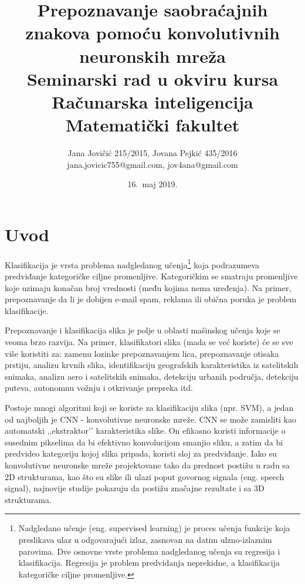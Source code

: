 \documentclass[a4paper]{article}
\begin{document}
\title{Prepoznavanje saobraćajnih znakova pomoću konvolutivnih neuronskih mreža\\ \small{Seminarski rad u okviru kursa\\Računarska inteligencija\\ Matematički fakultet}}

\author{Jana Jovičić 215/2015, Jovana Pejkić 435/2016 \\ jana.jovicic755@gmail.com, jov4ana@gmail.com}

\date{16.~maj 2019.}

\maketitle

\abstract{

}

\newpage

\tableofcontents

\newpage

\section{Uvod}
\label{sec:uvod}

Klasifikacija je vrsta problema nadgledanog učenja\footnote{Nadgledano učenje (eng. supervised learning) je proces učenja funkcije koja preslikava ulaz u odgovarajući izlaz, zasnovan na datim ulzno-izlaznim parovima. Dve osnovne vrste problema nadgledanog učenja su regresija i klasifikacija. Regresija je problem predvidanja neprekidne, a klasifikacija kategoričke ciljne promenljive.} koja podrazumeva predviđanje kategoričke ciljne promenljive. Kategoričkim se smatraju promenljive koje uzimaju konačan broj vrednosti (među kojima nema uređenja). Na primer, prepoznavanje da li je dobijen e-mail spam, reklama ili obična poruka je problem klasifikacije.

Prepoznavanje i klasifikacija slika je polje u oblasti mašinskog učenja koje se veoma brzo razvija. Na primer, klasifikatori slika (mada se već koriste) će se sve više koristiti za: zamenu lozinke prepoznavanjem lica, prepoznavanje otisaka prstiju, analizu krvnih slika, identifikaciju geografskih karakteristika iz satelitskih snimaka, analizu aero i satelitskih snimaka, detekciju urbanih područja, detekciju puteva, autonomnu vožnju i otkrivanje prepreka itd.

Postoje mnogi algoritmi koji se koriste za klasifikaciju slika (npr. SVM), a jedan od najboljih je CNN - konvolutivne neuronske mreže. CNN se može zamisliti kao automatski ‚‚ekstraktor’’ karakteristika slike. On efikasno koristi informacije o susednim pikselima da bi efektivno konvolucijom smanjio sliku, a zatim da bi predvideo kategoriju kojoj slika pripada, koristi sloj za predviđanje. Iako su konvolutivne neuronske mreže projektovane tako da prednost postižu u radu sa 2D strukturama, kao što su slike ili ulazi poput govornog signala (eng. speech signal), najnovije studije pokazuju da postižu značajne rezultate i sa 3D strukturama.
\end{document}
